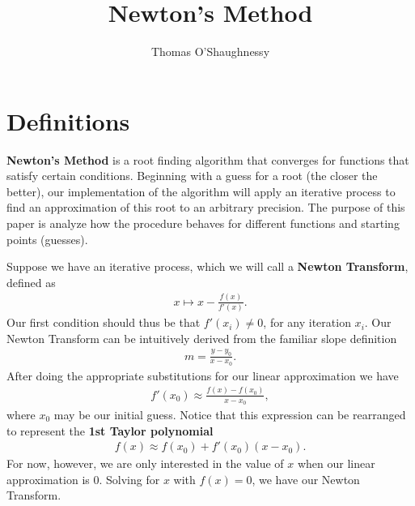 \documentclass[12pt]{article}
\author{Thomas O'Shaughnessy}
\title{Newton's Method}
\begin{document}
\maketitle
\section{Definitions}

\textbf{Newton's Method} is a root finding algorithm that converges for functions 
that satisfy certain
conditions. Beginning with a guess for a root (the closer the better), our implementation
of the algorithm will apply an iterative process to find an approximation of this root
to an arbitrary precision. The purpose of this paper is analyze how the procedure behaves
for different functions and starting points (guesses).

Suppose we have an iterative process, which we will call a \textbf{Newton Transform}, defined as
\begin{gather*}
				x \mapsto x - \frac{f(x)}{f'(x)}.
\end{gather*}
Our first condition should thus be that $f'(x_i) \neq 0$, for any iteration $x_i$.
Our Newton Transform can be intuitively derived from the familiar slope definition
\begin{gather*}
				m=\frac{y-y_0}{x-x_0}.
\end{gather*}
After doing the appropriate substitutions for our linear approximation we have
\begin{gather*}
				f'(x_0)\approx\frac{f(x)-f(x_0)}{x-x_0},
\end{gather*}
where $x_0$ may be our initial guess. Notice that this expression can be rearranged
to represent the \textbf{1st Taylor polynomial}
\begin{gather*}
				f(x)\approx f(x_0)+f'(x_0)(x-x_0).
\end{gather*}
For now, however, we are only interested in the value of $x$ when our
linear approximation is $0$. Solving for $x$ with $f(x) = 0$, we have our Newton Transform.
\end{document}
